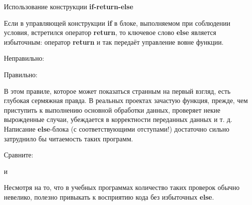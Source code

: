 \begin{typerror}
	\label{TE_if-return-else}
	Использование конструкции \textbf{if-return-else}

	Если в управляющей конструкции \textbf{if} в блоке, выполняемом при соблюдении условия, встретился оператор \textbf{return}, то ключевое слово \textbf{else} является избыточным: оператор \textbf{return} и так передаёт управление вовне функции.

	Неправильно:

	Правильно:

	В этом правиле, которое может показаться странным на первый взгляд, есть глубокая сермяжная правда.
	В реальных проектах зачастую функция, прежде, чем приступить к выполнению основной обработки данных, проверяет некие вырожденные случаи, убеждается в корректности переданных данных и т. д.
	Написание \textbf{else}-блока (с соответствующими отступами!) достаточно сильно затруднило бы читаемость таких программ.

	Сравните:

	и


	Несмотря на то, что в учебных программах количество таких проверок обычно невелико, полезно привыкать к восприятию кода без избыточных \textbf{else}. 

	

	
\end{typerror}
